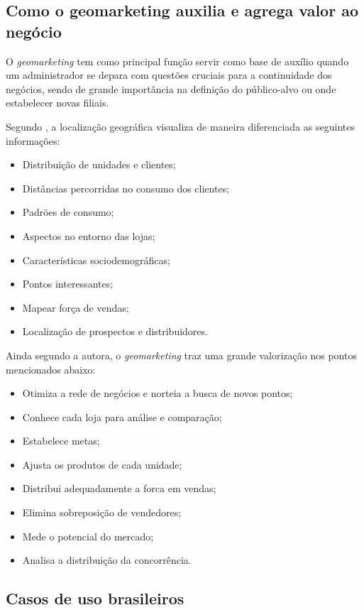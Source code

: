 \subsection{Como o geomarketing auxilia e agrega valor ao negócio}
\label{importancia}
O \emph{geomarketing} tem como principal função servir como base de auxílio quando um administrador se depara com questões cruciais para a continuidade dos negócios, sendo de grande importância na definição do público-alvo ou onde estabelecer novas filiais.

Segundo , a localização geográfica visualiza de maneira diferenciada as seguintes informações:

\begin{itemize}
  \item Distribuição de unidades e clientes;
  \item Distâncias percorridas no consumo dos clientes;
  \item Padrões de consumo;
  \item Aspectos no entorno das lojas;
  \item Características sociodemográficas;
  \item Pontos interessantes;
  \item Mapear força de vendas;
  \item Localização de prospectos e distribuidores.
\end{itemize}

Ainda segundo a autora, o \emph{geomarketing} traz uma grande valorização nos pontos mencionados abaixo:

\begin{itemize}
  \item Otimiza a rede de negócios e norteia a busca de novos pontos;
  \item Conhece cada loja para análise e comparação;
  \item Estabelece metas;
  \item Ajusta os produtos de cada unidade;
  \item Distribui adequadamente a forca em vendas;
  \item Elimina sobreposição de vendedores;
  \item Mede o potencial do mercado;
  \item Analisa a distribuição da concorrência.
\end{itemize}

\subsection{Casos de uso brasileiros}

